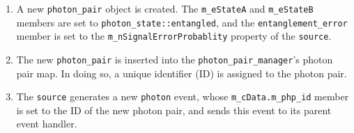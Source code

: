 \begin{enumerate}

\item A new \texttt{photon\_pair} object is created. The \texttt{m\_eStateA} and \texttt{m\_eStateB} members are set to \texttt{photon\_state::entangled}, and the \texttt{entanglement\_error} member is set to the \texttt{m\_nSignalErrorProbablity} property of the \texttt{source}.

\item The new \texttt{photon\_pair} is inserted into the \texttt{photon\_pair\_manager}'s photon pair map. In doing so, a unique identifier (ID) is assigned to the photon pair.

\item The \texttt{source} generates a new \texttt{photon} event, whose \texttt{m\_cData.m\_php\_id} member is set to the ID of the new photon pair, and sends this event to its parent event handler.

\end{enumerate}
